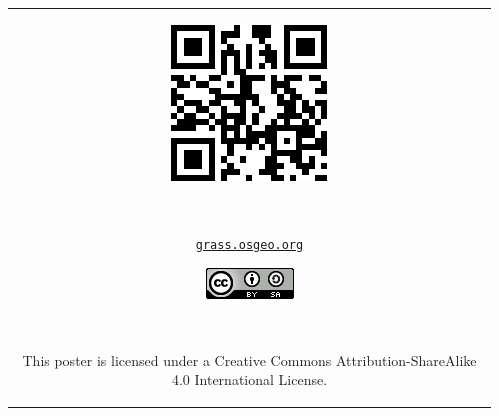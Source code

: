 \documentclass[25pt, margin=0mm, innermargin=15mm, blockverticalspace=15mm, colspace=15mm, subcolspace=8mm]{tikzposter}
\begin{document}
\begin{columns}
{\textcolor{gray}{
\hrulefill
}

\vspace{0.1cm}

\newcommand{\qrcodesize}{0.05\linewidth}


\begin{center}
\begin{tabular}{c}


\begin{minipage}{\qrcodesize}
\includegraphics[width=\textwidth]{./images/qr_grass.pdf}
\end{minipage}
~
\begin{minipage}{0.15\linewidth}
\small {\href{http://grass.osgeo.org}{\nolinkurl{grass.osgeo.org}}}
\end{minipage}

\begin{minipage}{0.1\linewidth}
\href{http://creativecommons.org/licenses/by-sa/4.0/}{\includegraphics[width=\textwidth]{ccbysa}}
\end{minipage}
~
\begin{minipage}{0.35\linewidth}
\small This poster is licensed under a Creative Commons Attribution-ShareAlike 4.0 International License.
\end{minipage}


\end{tabular}
\end{center}}
\end{columns}
\end{document}
